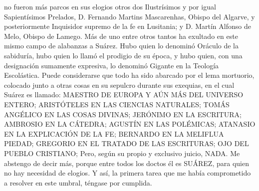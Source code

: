 \documentclass{article}
\begin{document}
no fueron más parcos en sus elogios otros dos Ilustrísimos y por igual Sapientísimos
Prelados, D. Fernando Martins Mascarenhas, Obispo del Algarve, y posteriormente
Inquisidor supremo de la fe en Lusitania; y D. Martín Alfonso de Melo, Obispo de Lamego.
Más de uno entre otros tantos ha exultado en este mismo campo de alabanzas a Suárez.
Hubo quien lo denominó Oráculo de la sabiduría, hubo quien lo llamó el prodigio de su
época, y hubo quien, con una designación sumamente expresiva, lo denominó Gigante en la
Teología Escolástica. Puede considerarse que todo ha sido abarcado por el lema
mortuorio, colocado junto a otras cosas en su sepulcro durante sus exequias, en el cual
Suárez es llamado: MAESTRO DE EUROPA Y AÚN MÁS DEL UNIVERSO ENTERO; ARISTÓTELES EN LAS
CIENCIAS NATURALES; TOMÁS ANGÉLICO EN LAS COSAS DIVINAS; JERÓNIMO EN LA ESCRITURA;
AMBROSIO EN LA CÁTEDRA; AGUSTÍN EN LAS POLÉMICAS; ATANASIO EN LA EXPLICACIÓN DE LA FE;
BERNARDO EN LA MELIFLUA PIEDAD; GREGORIO EN EL TRATADO DE LAS ESCRITURAS; OJO DEL PUEBLO
CRISTIANO; Pero, según su propio y exclusivo juicio, NADA. Me abstengo de decir más,
porque entre todos los doctos él es SUÁREZ, para quien no hay necesidad de elogios. Y
así, la primera tarea que me había comprometido a resolver en este umbral, téngase por
cumplida.
\end{document}
